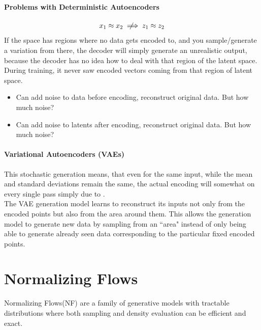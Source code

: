 \documentclass[11pt]{article}
\begin{document}
\paragraph{Problems with Deterministic Autoencoders}
$$x_1 \approx x_2 \notimplies z_1 \approx z_2$$
If the space has regions where no data gets encoded to, and you sample/generate a variation from there, the decoder will simply generate an unrealistic output, because the decoder has no idea how to deal with that region of the latent space. During training, it never saw encoded vectors coming from that region of latent space.\\
\begin{itemize}
	\item Can add noise to data before encoding, reconstruct original data. But how much noise? 
	\item Can add noise to latents after encoding, reconstruct original data. But how much noise?
\end{itemize}

\paragraph{Variational Autoencoders (VAEs)}
This stochastic generation means, that even for the same input, while the mean and standard deviations remain the same, the actual encoding will somewhat  on every single pass simply due to . \\
The VAE generation model learns to reconstruct its inputs not only from the encoded points but also from the area around them. This allows the generation model to generate new data by sampling from an ``area" instead of only being able to generate already seen data corresponding to the particular fixed encoded points.

\section{Normalizing Flows}
Normalizing Flows(NF) are a family of generative models with tractable distributions where both sampling and density evaluation can be efficient and exact.
\end{document}
